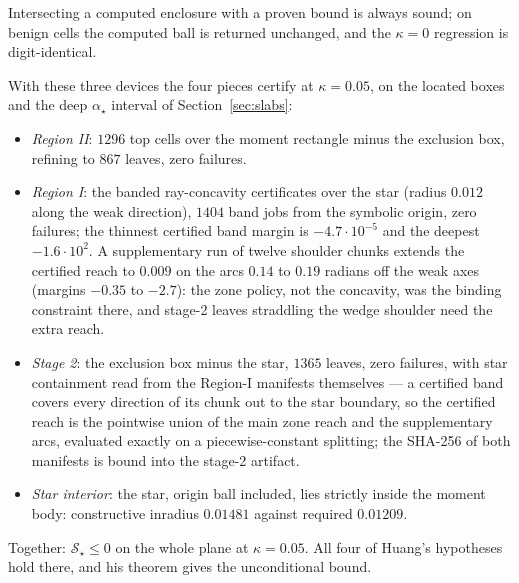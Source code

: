 \documentclass[11pt]{article}
\theoremstyle{remark}
\newcommand{\sS}{\mathcal{S}}
\begin{document}
Intersecting a computed
enclosure with a proven bound is always sound; on benign cells the
computed ball is returned unchanged, and the $\kappa=0$ regression is
digit-identical.

With these three devices the four pieces certify at $\kappa=0.05$, on
the located boxes and the deep $\alpha_\star$ interval of
Section~\ref{sec:slabs}:

\begin{itemize}
\item[(i)] \emph{Region II}: $1296$ top cells over the moment
rectangle minus the exclusion box, refining to $867$ leaves, zero
failures.
\item[(ii)] \emph{Region I}: the banded ray-concavity certificates
over the star (radius $0.012$ along the weak direction), $1404$
band jobs from the symbolic origin, zero failures; the thinnest
certified band margin is $-4.7\cdot10^{-5}$ and the deepest
$-1.6\cdot10^{2}$.  A supplementary run of twelve shoulder chunks
extends the certified reach to $0.009$ on the arcs $0.14$ to $0.19$
radians off the weak axes (margins $-0.35$ to $-2.7$): the zone
policy, not the concavity, was the binding constraint there, and
stage-2 leaves straddling the wedge shoulder need the extra reach.
\item[(iii)] \emph{Stage 2}: the exclusion box minus the star,
$1365$ leaves, zero failures, with star containment read from the
Region-I manifests themselves --- a certified band covers every
direction of its chunk out to the star boundary, so the certified
reach is the pointwise union of the main zone reach and the
supplementary arcs, evaluated exactly on a piecewise-constant
splitting; the SHA-256 of both manifests is bound into the stage-2
artifact.
\item[(iv)] \emph{Star interior}: the star, origin ball included,
lies strictly inside the moment body: constructive inradius
$0.01481$ against required $0.01209$.
\end{itemize}

Together: $\sS_\star\le0$ on the whole plane at $\kappa=0.05$.  All
four of Huang's hypotheses hold there, and his theorem gives the
unconditional bound.
\end{document}

